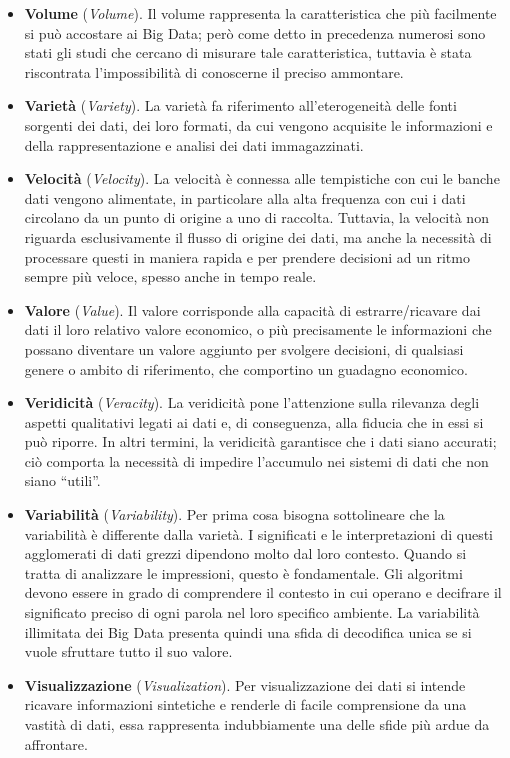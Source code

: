 \begin{itemize}
    \item \textbf{Volume} (\textit{Volume}). Il volume rappresenta la caratteristica che più facilmente si può accostare ai Big Data; però come detto in precedenza numerosi sono stati gli studi che cercano di misurare tale caratteristica, tuttavia è stata riscontrata l'impossibilità di conoscerne il preciso ammontare.
    \item \textbf{Varietà} (\textit{Variety}). La varietà fa riferimento all'eterogeneità delle fonti sorgenti dei dati, dei loro formati, da cui vengono acquisite le informazioni e della rappresentazione e analisi dei dati immagazzinati.
    \item \textbf{Velocità} (\textit{Velocity}). La velocità è connessa alle tempistiche con cui le banche dati vengono alimentate, in particolare alla alta frequenza con cui i dati circolano da un punto di origine a uno di raccolta. Tuttavia, la velocità non riguarda esclusivamente il flusso di origine dei dati, ma anche la necessità di processare questi in maniera rapida e per prendere decisioni ad un ritmo sempre più veloce, spesso anche in tempo reale.
    \item \textbf{Valore} (\textit{Value}). Il valore corrisponde alla capacità di estrarre/ricavare dai dati il loro relativo valore economico, o più precisamente le informazioni che possano diventare un valore aggiunto per svolgere decisioni, di qualsiasi genere o ambito di riferimento, che comportino un guadagno economico. 
    \item \textbf{Veridicità} (\textit{Veracity}). La veridicità pone l'attenzione sulla rilevanza degli aspetti qualitativi legati ai dati e, di conseguenza, alla fiducia che in essi si può riporre. In altri termini, la veridicità garantisce che i dati siano accurati; ciò comporta la necessità di impedire l'accumulo nei sistemi di dati che non siano “utili”.
    \item \textbf{Variabilità} (\textit{Variability}). Per prima cosa bisogna sottolineare che la variabilità è differente dalla varietà. I significati e le interpretazioni di questi agglomerati di dati grezzi dipendono molto dal loro contesto. Quando si tratta di analizzare le impressioni, questo è fondamentale. Gli algoritmi devono essere in grado di comprendere il contesto in cui operano e decifrare il significato preciso di ogni parola nel loro specifico ambiente. La variabilità illimitata dei Big Data presenta quindi una sfida di decodifica unica se si vuole sfruttare tutto il suo valore.
    \item \textbf{Visualizzazione} (\textit{Visualization}). Per visualizzazione dei dati si intende ricavare informazioni sintetiche e renderle di facile comprensione da una vastità di dati, essa rappresenta indubbiamente una delle sfide più ardue da affrontare.
\end{itemize}

